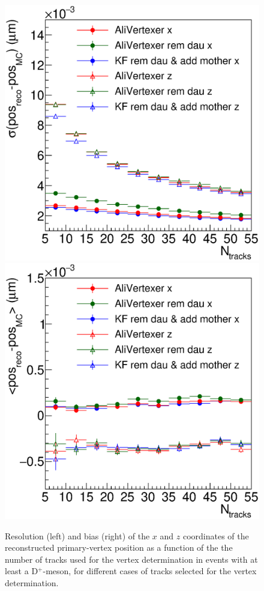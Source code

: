 \documentclass[b5paper,10pt,twoside,oldstyle,classica]{toptesi}
\begin{document}
\begin{figure}[b]
\begin{center}
{\includegraphics[scale = 0.28]{cPVresXZ.eps}}
\hspace{0.cm}
{\includegraphics[scale = 0.28]{cPVmeanXZ.eps}}
\caption{Resolution (left) and bias (right) of the $x$ and $z$ coordinates of the reconstructed primary-vertex position as a function of the the number of tracks used for the vertex determination in events with at least a D$^+$-meson, for different cases of tracks selected for the vertex determination.}
\label{KF_PVmanip}
\end{center}
\end{figure}
\end{document}
